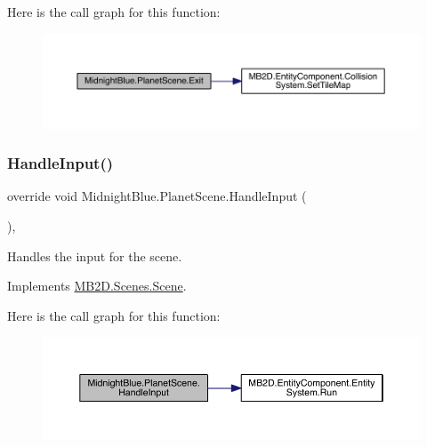Here is the call graph for this function\+:
\nopagebreak
\begin{figure}[H]
\begin{center}
\leavevmode
\includegraphics[width=350pt]{class_midnight_blue_1_1_planet_scene_af3aab90a13294493e1f2cd29b0fb60e6_cgraph}
\end{center}
\end{figure}
\hypertarget{class_midnight_blue_1_1_planet_scene_a6c84a639f27b9f7510b514969d47d1bd}{}\label{class_midnight_blue_1_1_planet_scene_a6c84a639f27b9f7510b514969d47d1bd} 
\subsubsection{\texorpdfstring{Handle\+Input()}{HandleInput()}}
{\footnotesize\ttfamily override void Midnight\+Blue.\+Planet\+Scene.\+Handle\+Input (\begin{DoxyParamCaption}{ }\end{DoxyParamCaption})\hspace{0.3cm}{\ttfamily [inline]}, {\ttfamily [virtual]}}



Handles the input for the scene. 



Implements \hyperlink{class_m_b2_d_1_1_scenes_1_1_scene_a476de5a885408d27ff151044d20738c8}{M\+B2\+D.\+Scenes.\+Scene}.

Here is the call graph for this function\+:
\nopagebreak
\begin{figure}[H]
\begin{center}
\leavevmode
\includegraphics[width=350pt]{class_midnight_blue_1_1_planet_scene_a6c84a639f27b9f7510b514969d47d1bd_cgraph}
\end{center}
\end{figure}
\hypertarget{class_midnight_blue_1_1_planet_scene_ac8b7e88283b22b87aa45f116b549e86f}{}\label{class_midnight_blue_1_1_planet_scene_ac8b7e88283b22b87aa45f116b549e86f} 
